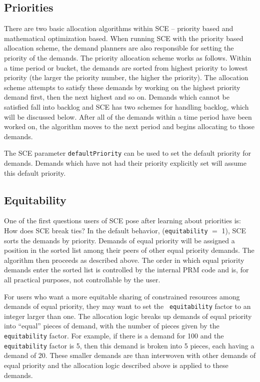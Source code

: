 \subsection{Priorities}
There are two basic allocation algorithms within SCE -- priority based
and mathematical optimization based.  When running SCE with the
priority based allocation scheme, the demand planners are also
responsible for setting the priority of the demands.  The priority
allocation scheme works as follows.  Within a time period or bucket,
the demands are sorted from highest priority to lowest priority (the
larger the priority number, the higher the priority).  The allocation
scheme attempts to satisfy these demands by working on the highest
priority demand first, then the next highest and so on.  Demands which
cannot be satisfied fall into backlog and SCE has two schemes for
handling backlog, which will be discussed below.  After all of the
demands within a time period have been worked on, the algorithm moves
to the next period and begins allocating to those demands.

The SCE parameter {\tt defaultPriority} can be used to set the
default priority for demands.  Demands which have not had their
priority explicitly set will assume this default priority.

\subsection{Equitability}
One of the first questions users of SCE pose after learning about
priorities is: How does SCE break ties?  In the default behavior,
({\tt equitability} $=$ 1), SCE sorts the demands by priority.
Demands of equal priority will be assigned a position in the sorted
list among their peers of other equal priority demands.  The algorithm
then proceeds as described above.  The order in which equal priority
demands enter the sorted list is controlled by the internal PRM code
and is, for all practical purposes, not controllable by the user.
 
For users who want a more equitable sharing of constrained resources
among demands of equal priority, they may want to set the {\tt
equitability} factor to an integer larger than one.  The allocation
logic breaks up demands of equal priority into ``equal'' pieces of
demand, with the number of pieces given by the {\tt equitability}
factor.  For example, if there is a demand for 100 and the {\tt
equitability} factor is 5, then this demand is broken into 5 pieces,
each having a demand of 20.  These smaller demands are than interwoven
with other demands of equal priority and the allocation logic
described above is applied to these demands.

